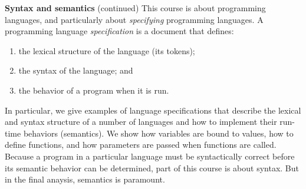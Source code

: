 \begin{minipage}[t]{\sw}
\slidenumber
\LARGE
{\bf Syntax and semantics} (continued)\exx
This course is about programming languages,
and particularly about {\em specifying} programming languages.
A programming language {\em specification} is a document that defines:
\begin{enumerate}
\item the lexical structure of the language (its tokens);
\item the syntax of the language; and
\item the behavior of a program when it is run.
\end{enumerate}
In particular,
we give examples of language specifications
that describe the lexical and syntax structure
of a number of languages
and how to implement their run-time behaviors (semantics).
We show how variables are bound to values,
how to define functions,
and how parameters are passed when functions are called.\exx
Because a program in a particular language must be syntactically correct
before its semantic behavior can be determined,
part of this course is about syntax.
But in the final anaysis, semantics is paramount.
\end{minipage}
\clearpage
